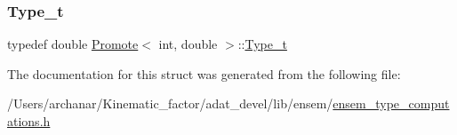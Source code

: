 \subsubsection{\texorpdfstring{Type\_t}{Type\_t}\hspace{0.1cm}{\footnotesize\ttfamily [2/2]}}
{\footnotesize\ttfamily typedef double \mbox{\hyperlink{structPromote}{Promote}}$<$ int, double $>$\+::\mbox{\hyperlink{structPromote_3_01int_00_01double_01_4_afa774ce31e3f3add209e00c1c5b1c369}{Type\+\_\+t}}}



The documentation for this struct was generated from the following file\+:\begin{DoxyCompactItemize}
\item 
/\+Users/archanar/\+Kinematic\+\_\+factor/adat\+\_\+devel/lib/ensem/\mbox{\hyperlink{lib_2ensem_2ensem__type__computations_8h}{ensem\+\_\+type\+\_\+computations.\+h}}\end{DoxyCompactItemize}
